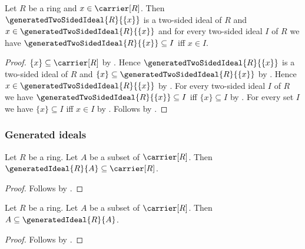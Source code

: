 \begin{theorem}\label{principal_two_sided_ideal_properties}
    Let $R$ be a ring and $x\in\carrier[R]$.
    Then $\generatedTwoSidedIdeal{R}{\{x\}}$ is a two-sided ideal of $R$
        and $x\in\generatedTwoSidedIdeal{R}{\{x\}}$ and
        for every two-sided ideal $I$ of $R$ we have
            $\generatedTwoSidedIdeal{R}{\{x\}}\subseteq I$ iff $x\in I$.
\end{theorem}
\begin{proof}
    $\{x\}\subseteq\carrier[R]$ by .
    Hence $\generatedTwoSidedIdeal{R}{\{x\}}$ is a two-sided ideal of $R$
        and $\{x\}\subseteq\generatedTwoSidedIdeal{R}{\{x\}}$ by
        .
    Hence $x\in\generatedTwoSidedIdeal{R}{\{x\}}$ by
        .
    For every two-sided ideal $I$ of $R$ we have
        $\generatedTwoSidedIdeal{R}{\{x\}}\subseteq I$ iff
        $\{x\}\subseteq I$ by
        .
    For every set $I$ we have $\{x\}\subseteq I$ iff $x\in I$ by
        .
    Follows by \auto.
\end{proof}

\subsubsection{Generated ideals}

\begin{proposition}\label{generated_ideal_subseteq_carrier}
    Let $R$ be a ring.
    Let $A$ be a subset of $\carrier[R]$.
    Then $\generatedIdeal{R}{A}\subseteq\carrier[R]$.
\end{proposition}
\begin{proof}
    Follows by
        .
\end{proof}

\begin{proposition}\label{generated_ideal_contains_generators}
    Let $R$ be a ring.
    Let $A$ be a subset of $\carrier[R]$.
    Then $A\subseteq\generatedIdeal{R}{A}$.
\end{proposition}
\begin{proof}
    Follows by
        .
\end{proof}

